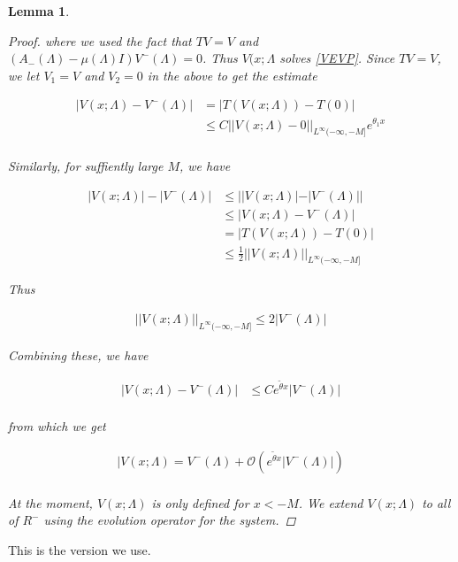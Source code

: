 \documentclass[12pt]{article}
\newtheorem{lemma}{Lemma}
\begin{document}
\begin{lemma}
\begin{proof}
where we used the fact that $TV = V$ and $(A_-(\Lambda) - \mu(\Lambda)I)V^-(\Lambda) = 0$. Thus $V(x; \Lambda$ solves \eqref{VEVP}. Since $TV = V$, we let $V_1 = V$ and $V_2 = 0$ in the above to get the estimate

\begin{align*}
|V(x; \Lambda) - V^-(\Lambda)| &= |T(V(x; \Lambda)) - T(0)| \\
&\leq C ||V(x; \Lambda) - 0||_{L^\infty(-\infty, -M]} e^{\theta_1 x} \\
\end{align*}

Similarly, for suffiently large $M$, we have

\begin{align*}
|V(x; \Lambda)| - |V^-(\Lambda)| &\leq | |V(x; \Lambda)| - |V^-(\Lambda)| | \\
&\leq |V(x; \Lambda) - V^-(\Lambda)| \\
&= |T(V(x; \Lambda)) - T(0)| \\
&\leq \frac{1}{2} ||V(x; \Lambda)||_{L^\infty(-\infty, -M]}
\end{align*}

Thus

\begin{align*}
||V(x; \Lambda)||_{L^\infty(-\infty, -M]} \leq 2 |V^-(\Lambda)|
\end{align*}

Combining these, we have

\begin{align*}
|V(x; \Lambda) - V^-(\Lambda)| &\leq C e^{\tilde{\theta} x}|V^-(\Lambda)| \\
\end{align*}

from which we get

\begin{align*}
|V(x; \Lambda) = V^-(\Lambda) + \mathcal{O}( e^{\tilde{\theta} x}|V^-(\Lambda)| )\\
\end{align*}

At the moment, $V(x; \Lambda)$ is only defined for $x < -M$. We extend $V(x; \Lambda)$ to all of $R^-$ using the evolution operator for the system.

\end{proof}
\end{lemma}


This is the version we use.
\end{document}
